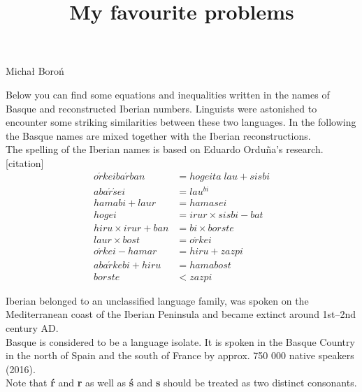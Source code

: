 \documentclass[a4paper, 12pt, english]{article}
\author{}
\date{}
\title{\textbf{My favourite problems}\vspace{-4em}}
\begin{document}
\maketitle{}

\begin{problem*}{Michał Boroń}

Below you can find some equations and inequalities written in the names of Basque and reconstructed Iberian numbers.
Linguists were astonished to encounter some striking similarities between these two languages.
In the following the Basque names are mixed together with the Iberian reconstructions.\\
The spelling of the Iberian names is based on Eduardo Ordu\~na's research.[citation]
\begin{align}
o\acute{r}keiba\acute{r}ban &= hogeita\; lau + sisbi\label{eq:first} \\
aba\acute{r}\acute{s}ei &= lau^{bi} \\
hamabi + laur &= hamasei \\
hogei &= irur \times sisbi - bat \\
hiru \times irur + ban &= bi \times borste \\
laur \times bost &= o\acute{r}kei \\
o\acute{r}kei - hamar &= hiru + zazpi \\
aba\acute{r}kebi + hiru &= hamabost \\
borste &< zazpi\label{eq:last}
\end{align}

\begin{tasks}
\end{tasks}

\begin{langinfo}
Iberian belonged to an unclassified language family, was spoken on the Mediterranean coast of the Iberian Peninsula
and became extinct around 1st--2nd century AD.\\
\indent Basque is considered to be a language isolate.
It is spoken in the Basque Country in the north of Spain and the south of France by approx. 750 000 native speakers (2016).\\

Note that \textbf{\'r} and \textbf{r} as well as \textbf{\'s} and \textbf{s} should be treated as two distinct consonants.
\end{langinfo}

\end{problem*}
\end{document}

